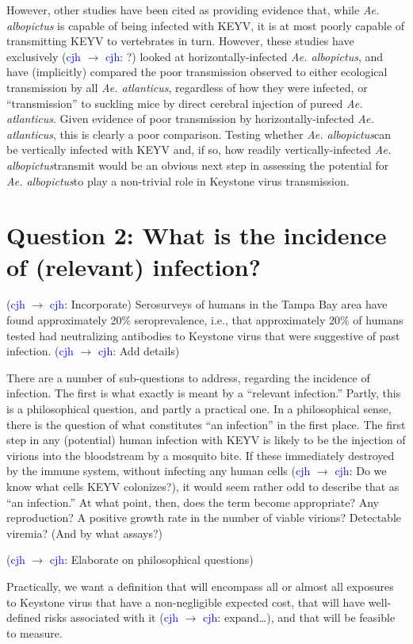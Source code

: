 \documentclass[12pt]{article}
\newcommand{\alb}{\textit{Ae. albopictus}}
\newcommand{\atl}{\textit{Ae. atlanticus}}
\newcommand{\cjh}{\textcolor{blue}{cjh}}
\newcommand{\msg}[3]{(#1 $\rightarrow$ #2: #3)}
\newcommand{\mcc}[1]{\msg\cjh\cjh{#1}}
\begin{document}
            However, other studies have been cited as providing evidence that, while \textit{Ae. albopictus} is capable of being infected with KEYV, it is at most poorly capable of transmitting KEYV to vertebrates in turn. However, these studies have exclusively \mcc{?} looked at horizontally-infected \alb, and have (implicitly) compared the poor transmission observed to either ecological transmission by all \atl, regardless of how they were infected, or ``transmission'' to suckling mice by direct cerebral injection of pureed \atl. Given evidence of poor transmission by horizontally-infected \atl, this is clearly a poor comparison. Testing whether \alb can be vertically infected with KEYV and, if so, how readily vertically-infected \alb transmit would be an obvious next step in assessing the potential for \alb to play a non-trivial role in Keystone virus transmission.


    \section[Incidence of infection]{Question 2: What is the incidence of (relevant) infection?}

        \mcc{Incorporate} Serosurveys of humans in the Tampa Bay area have found approximately 20\% seroprevalence, i.e., that approximately 20\% of humans tested had neutralizing antibodies to Keystone virus that were suggestive of past infection.
            \mcc{Add details}

        There are a number of sub-questions to address, regarding the incidence of infection. The first is what exactly is meant by a ``relevant infection.'' Partly, this is a philosophical question, and partly a practical one. In a philosophical sense, there is the question of what constitutes ``an infection'' in the first place. The first step in any (potential) human infection with KEYV is likely to be the injection of virions into the bloodstream by a mosquito bite. If these immediately destroyed by the immune system, without infecting any human cells \mcc{Do we know what cells KEYV colonizes?}, it would seem rather odd to describe that as ``an infection.'' At what point, then, does the term become appropriate? Any reproduction? A positive growth rate in the number of viable virions? Detectable viremia? (And by what assays?)

        \mcc{Elaborate on philosophical questions} 
        
        Practically, we want a definition that will encompass all or almost all exposures to Keystone virus that have a non-negligible expected cost, that will have well-defined risks associated with it \mcc{expand\dots}, and that will be feasible to measure.
\end{document}
